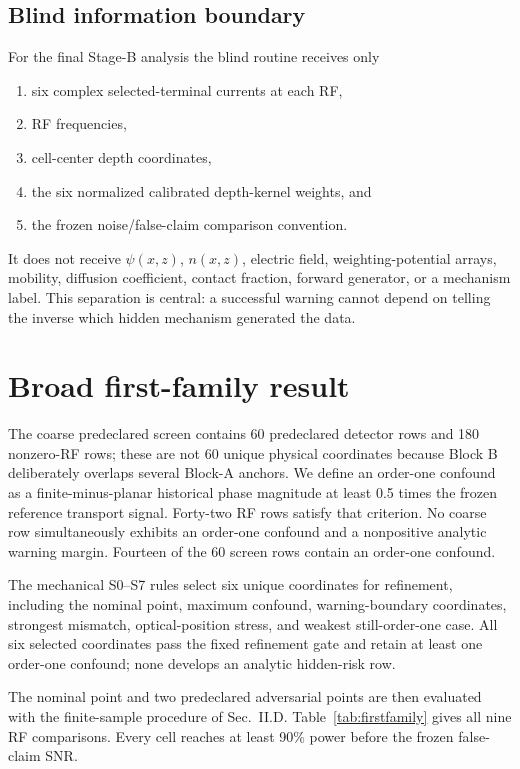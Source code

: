 \documentclass[11pt]{article}
\begin{document}
\subsection{Blind information boundary}

For the final Stage-B analysis the blind routine receives only
\begin{enumerate}[label=(\roman*)]
\item six complex selected-terminal currents at each RF,
\item RF frequencies,
\item cell-center depth coordinates,
\item the six normalized calibrated depth-kernel weights, and
\item the frozen noise/false-claim comparison convention.
\end{enumerate}
It does not receive $\psi(x,z)$, $n(x,z)$, electric field, weighting-potential arrays, mobility, diffusion coefficient, contact fraction, forward generator, or a mechanism label. This separation is central: a successful warning cannot depend on telling the inverse which hidden mechanism generated the data.

\section{Broad first-family result}

The coarse predeclared screen contains 60 predeclared detector rows and 180 nonzero-RF rows; these are not 60 unique physical coordinates because Block B deliberately overlaps several Block-A anchors. We define an order-one confound as a finite-minus-planar historical phase magnitude at least 0.5 times the frozen reference transport signal. Forty-two RF rows satisfy that criterion. No coarse row simultaneously exhibits an order-one confound and a nonpositive analytic warning margin. Fourteen of the 60 screen rows contain an order-one confound.

The mechanical S0--S7 rules select six unique coordinates for refinement, including the nominal point, maximum confound, warning-boundary coordinates, strongest mismatch, optical-position stress, and weakest still-order-one case. All six selected coordinates pass the fixed refinement gate and retain at least one order-one confound; none develops an analytic hidden-risk row.

The nominal point and two predeclared adversarial points are then evaluated with the finite-sample procedure of Sec.~II.D. Table~\ref{tab:firstfamily} gives all nine RF comparisons. Every cell reaches at least 90\% power before the frozen false-claim SNR.
\end{document}
